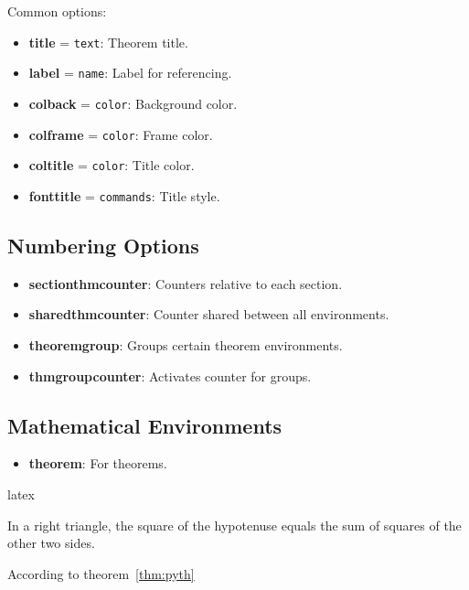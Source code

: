 \documentclass[
    margin=2cm
]{neoschool}
\begin{document}
Common options:

\begin{itemize}
\item
  \textbf{title} = \texttt{text}: Theorem title.
\item
  \textbf{label} = \texttt{name}: Label for
  referencing.
\item
  \textbf{colback} = \texttt{color}: Background color.
\item
  \textbf{colframe} = \texttt{color}: Frame color.
\item
  \textbf{coltitle} = \texttt{color}: Title color.
\item
  \textbf{fonttitle} = \texttt{commands}: Title style.
\end{itemize}

\subsection{Numbering Options}

\begin{itemize}
\item
  \textbf{sectionthmcounter}: Counters relative to each section.
\item
  \textbf{sharedthmcounter}: Counter shared between all environments.
\item
  \textbf{theoremgroup}: Groups certain theorem environments.
\item
  \textbf{thmgroupcounter}: Activates counter for groups.
\end{itemize}

\subsection{Mathematical
Environments}

\begin{itemize}
\item
  \textbf{theorem}: For theorems.
\end{itemize}

\begin{code}{latex}
\begin{theorem}[title=Pythagorean Theorem,label=pyth]
    In a right triangle, the square of the
    hypotenuse equals the sum of squares
    of the other two sides.
\end{theorem}

According to theorem~\ref{thm:pyth}
\end{code}
\end{document}
